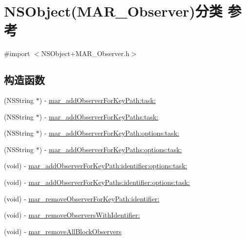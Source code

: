 \hypertarget{category_n_s_object_07_m_a_r___observer_08}{}\section{N\+S\+Object(M\+A\+R\+\_\+\+Observer)分类 参考}
\label{category_n_s_object_07_m_a_r___observer_08}


{\ttfamily \#import $<$N\+S\+Object+\+M\+A\+R\+\_\+\+Observer.\+h$>$}

\subsection*{构造函数}
\begin{DoxyCompactItemize}
\item 
(N\+S\+String $\ast$) -\/ \hyperlink{category_n_s_object_07_m_a_r___observer_08_a497f0915e9f4007edc155e8e0c4759f6}{mar\+\_\+add\+Observer\+For\+Key\+Path\+:task\+:}
\item 
(N\+S\+String $\ast$) -\/ \hyperlink{category_n_s_object_07_m_a_r___observer_08_ac71a10b5fb01a27977f5ea915908e9a9}{mar\+\_\+add\+Observer\+For\+Key\+Paths\+:task\+:}
\item 
(N\+S\+String $\ast$) -\/ \hyperlink{category_n_s_object_07_m_a_r___observer_08_a637caf75c5627817f1bb95908e88f222}{mar\+\_\+add\+Observer\+For\+Key\+Path\+:options\+:task\+:}
\item 
(N\+S\+String $\ast$) -\/ \hyperlink{category_n_s_object_07_m_a_r___observer_08_a842ee557d7ec4cce050353e41d046bc0}{mar\+\_\+add\+Observer\+For\+Key\+Paths\+:options\+:task\+:}
\item 
(void) -\/ \hyperlink{category_n_s_object_07_m_a_r___observer_08_aa0a9f6f044fa257f693ae1def9a9ed77}{mar\+\_\+add\+Observer\+For\+Key\+Path\+:identifier\+:options\+:task\+:}
\item 
(void) -\/ \hyperlink{category_n_s_object_07_m_a_r___observer_08_ae1ed2074c62870c31c6cd3a509b2c672}{mar\+\_\+add\+Observer\+For\+Key\+Paths\+:identifier\+:options\+:task\+:}
\item 
(void) -\/ \hyperlink{category_n_s_object_07_m_a_r___observer_08_aa49fb595cf00f3e5c39866cd9725ca62}{mar\+\_\+remove\+Observer\+For\+Key\+Path\+:identifier\+:}
\item 
(void) -\/ \hyperlink{category_n_s_object_07_m_a_r___observer_08_aab88fd3fc6d1476c5bde5f68caefe557}{mar\+\_\+remove\+Observers\+With\+Identifier\+:}
\item 
(void) -\/ \hyperlink{category_n_s_object_07_m_a_r___observer_08_a553909c6694453c63a8c38a1c132a4b5}{mar\+\_\+remove\+All\+Block\+Observers}

\end{DoxyCompactItemize}
